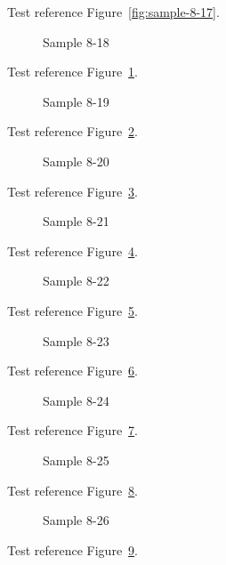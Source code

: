 Test reference Figure~\ref{fig:sample-8-17}.

\begin{figure}[tbhp]
\caption{Sample 8-18}
\label{fig:sample-8-18}
\end{figure}

Test reference Figure~\ref{fig:sample-8-18}.

\begin{figure}[tbhp]
\caption{Sample 8-19}
\label{fig:sample-8-19}
\end{figure}

Test reference Figure~\ref{fig:sample-8-19}.

\begin{figure}[tbhp]
\caption{Sample 8-20}
\label{fig:sample-8-20}
\end{figure}

Test reference Figure~\ref{fig:sample-8-20}.

\begin{figure}[tbhp]
\caption{Sample 8-21}
\label{fig:sample-8-21}
\end{figure}

Test reference Figure~\ref{fig:sample-8-21}.

\begin{figure}[tbhp]
\caption{Sample 8-22}
\label{fig:sample-8-22}
\end{figure}

Test reference Figure~\ref{fig:sample-8-22}.

\begin{figure}[tbhp]
\caption{Sample 8-23}
\label{fig:sample-8-23}
\end{figure}

Test reference Figure~\ref{fig:sample-8-23}.

\begin{figure}[tbhp]
\caption{Sample 8-24}
\label{fig:sample-8-24}
\end{figure}

Test reference Figure~\ref{fig:sample-8-24}.

\begin{figure}[tbhp]
\caption{Sample 8-25}
\label{fig:sample-8-25}
\end{figure}

Test reference Figure~\ref{fig:sample-8-25}.

\begin{figure}[tbhp]
\caption{Sample 8-26}
\label{fig:sample-8-26}
\end{figure}

Test reference Figure~\ref{fig:sample-8-26}.

